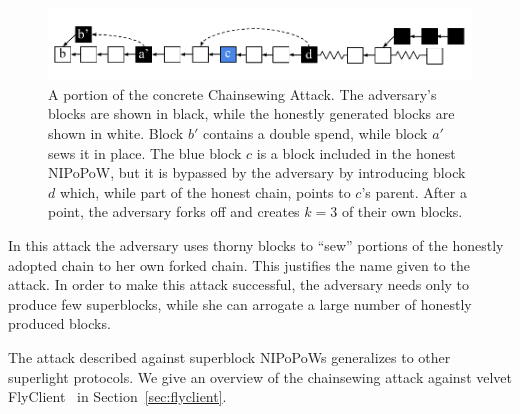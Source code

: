 \begin{figure}
	\begin{center}
		\includegraphics[width=0.99\columnwidth]{figures/chainsew-concrete.pdf}
	\end{center}
	\caption{A portion of the concrete Chainsewing Attack. The adversary's blocks are shown in black, while the honestly generated blocks are shown in white. Block $b'$ contains a double spend, while block $a'$ sews it in place. The blue block $c$ is a block included in the honest NIPoPoW, but it is bypassed by the adversary by introducing block $d$ which, while part of the honest chain, points to $c$'s parent. After a point, the adversary forks off and creates $k = 3$ of their own blocks.}
	\label{fig:attack}
\end{figure}

In this attack the adversary uses thorny blocks to ``sew'' portions of the
honestly adopted chain to her own forked chain. This justifies the name given to
the attack.
In order to make this attack successful, the adversary needs only to
produce few superblocks, while she can arrogate a large number of
honestly produced blocks.

The attack described against superblock NIPoPoWs generalizes to other superlight protocols.
We give an overview of the chainsewing attack against velvet FlyClient~\cite{flyclient} in
Section~\ref{sec:flyclient}.

